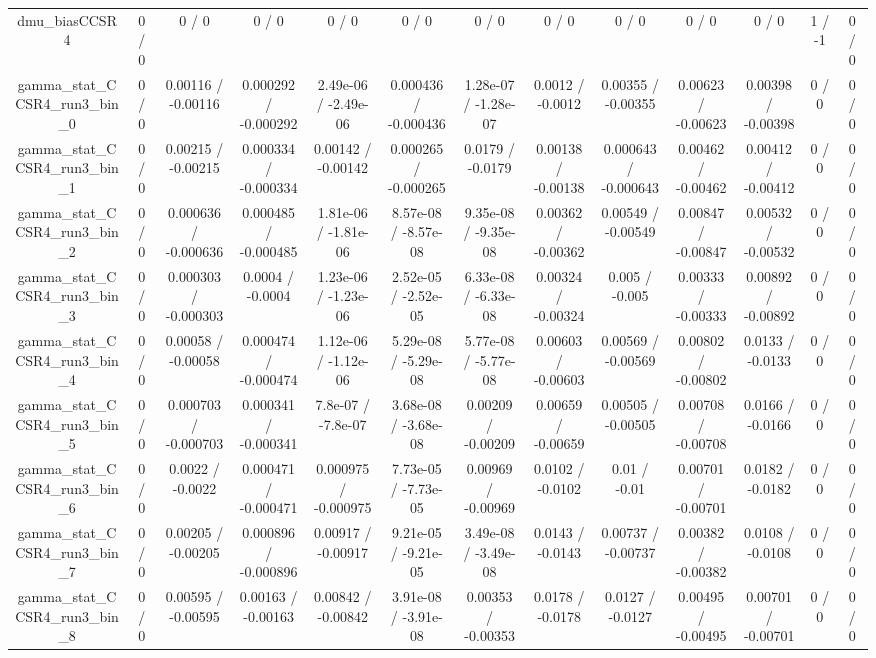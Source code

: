 \documentclass[10pt]{article}
\begin{document}
\begin{table}[htbp]
\begin{center}
\begin{tabular}{|c|c|c|c|c|c|c|c|c|c|c|c|c|}
  dmu_biasCCSR4 & 0 / 0 & 0 / 0 & 0 / 0 & 0 / 0 & 0 / 0 & 0 / 0 & 0 / 0 & 0 / 0 & 0 / 0 & 0 / 0 & 1 / -1 & 0 / 0 \\ 
  gamma_stat_CCSR4_run3_bin_0 & 0 / 0 & 0.00116 / -0.00116 & 0.000292 / -0.000292 & 2.49e-06 / -2.49e-06 & 0.000436 / -0.000436 & 1.28e-07 / -1.28e-07 & 0.0012 / -0.0012 & 0.00355 / -0.00355 & 0.00623 / -0.00623 & 0.00398 / -0.00398 & 0 / 0 & 0 / 0 \\ 
  gamma_stat_CCSR4_run3_bin_1 & 0 / 0 & 0.00215 / -0.00215 & 0.000334 / -0.000334 & 0.00142 / -0.00142 & 0.000265 / -0.000265 & 0.0179 / -0.0179 & 0.00138 / -0.00138 & 0.000643 / -0.000643 & 0.00462 / -0.00462 & 0.00412 / -0.00412 & 0 / 0 & 0 / 0 \\ 
  gamma_stat_CCSR4_run3_bin_2 & 0 / 0 & 0.000636 / -0.000636 & 0.000485 / -0.000485 & 1.81e-06 / -1.81e-06 & 8.57e-08 / -8.57e-08 & 9.35e-08 / -9.35e-08 & 0.00362 / -0.00362 & 0.00549 / -0.00549 & 0.00847 / -0.00847 & 0.00532 / -0.00532 & 0 / 0 & 0 / 0 \\ 
  gamma_stat_CCSR4_run3_bin_3 & 0 / 0 & 0.000303 / -0.000303 & 0.0004 / -0.0004 & 1.23e-06 / -1.23e-06 & 2.52e-05 / -2.52e-05 & 6.33e-08 / -6.33e-08 & 0.00324 / -0.00324 & 0.005 / -0.005 & 0.00333 / -0.00333 & 0.00892 / -0.00892 & 0 / 0 & 0 / 0 \\ 
  gamma_stat_CCSR4_run3_bin_4 & 0 / 0 & 0.00058 / -0.00058 & 0.000474 / -0.000474 & 1.12e-06 / -1.12e-06 & 5.29e-08 / -5.29e-08 & 5.77e-08 / -5.77e-08 & 0.00603 / -0.00603 & 0.00569 / -0.00569 & 0.00802 / -0.00802 & 0.0133 / -0.0133 & 0 / 0 & 0 / 0 \\ 
  gamma_stat_CCSR4_run3_bin_5 & 0 / 0 & 0.000703 / -0.000703 & 0.000341 / -0.000341 & 7.8e-07 / -7.8e-07 & 3.68e-08 / -3.68e-08 & 0.00209 / -0.00209 & 0.00659 / -0.00659 & 0.00505 / -0.00505 & 0.00708 / -0.00708 & 0.0166 / -0.0166 & 0 / 0 & 0 / 0 \\ 
  gamma_stat_CCSR4_run3_bin_6 & 0 / 0 & 0.0022 / -0.0022 & 0.000471 / -0.000471 & 0.000975 / -0.000975 & 7.73e-05 / -7.73e-05 & 0.00969 / -0.00969 & 0.0102 / -0.0102 & 0.01 / -0.01 & 0.00701 / -0.00701 & 0.0182 / -0.0182 & 0 / 0 & 0 / 0 \\ 
  gamma_stat_CCSR4_run3_bin_7 & 0 / 0 & 0.00205 / -0.00205 & 0.000896 / -0.000896 & 0.00917 / -0.00917 & 9.21e-05 / -9.21e-05 & 3.49e-08 / -3.49e-08 & 0.0143 / -0.0143 & 0.00737 / -0.00737 & 0.00382 / -0.00382 & 0.0108 / -0.0108 & 0 / 0 & 0 / 0 \\ 
  gamma_stat_CCSR4_run3_bin_8 & 0 / 0 & 0.00595 / -0.00595 & 0.00163 / -0.00163 & 0.00842 / -0.00842 & 3.91e-08 / -3.91e-08 & 0.00353 / -0.00353 & 0.0178 / -0.0178 & 0.0127 / -0.0127 & 0.00495 / -0.00495 & 0.00701 / -0.00701 & 0 / 0 & 0 / 0 \\ 

\end{tabular}
\end{center}
\end{table}
\end{document}
